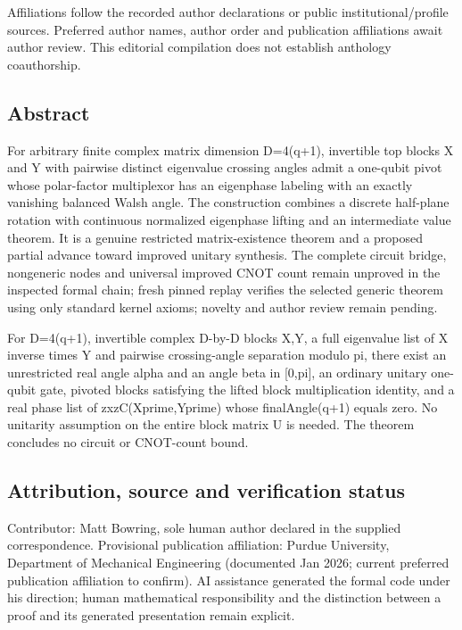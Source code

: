 \documentclass[11pt,a4paper]{article}
\begin{document}
{\small Affiliations follow the recorded author declarations or public institutional/profile sources. Preferred author names, author order and publication affiliations await author review. This editorial compilation does not establish anthology coauthorship.\par}

\subsection{Abstract}
For arbitrary finite complex matrix dimension D=4(q+1), invertible top blocks X and Y with pairwise distinct eigenvalue crossing angles admit a one-qubit pivot whose polar-factor multiplexor has an eigenphase labeling with an exactly vanishing balanced Walsh angle. The construction combines a discrete half-plane rotation with continuous normalized eigenphase lifting and an intermediate value theorem. It is a genuine restricted matrix-existence theorem and a proposed partial advance toward improved unitary synthesis. The complete circuit bridge, nongeneric nodes and universal improved CNOT count remain unproved in the inspected formal chain; fresh pinned replay verifies the selected generic theorem using only standard kernel axioms; novelty and author review remain pending.

For D=4(q+1), invertible complex D-by-D blocks X,Y, a full eigenvalue list of X inverse times Y and pairwise crossing-angle separation modulo pi, there exist an unrestricted real angle alpha and an angle beta in [0,pi], an ordinary unitary one-qubit gate, pivoted blocks satisfying the lifted block multiplication identity, and a real phase list of zxzC(Xprime,Yprime) whose finalAngle(q+1) equals zero. No unitarity assumption on the entire block matrix U is needed. The theorem concludes no circuit or CNOT-count bound.

\subsection{Attribution, source and verification status}
Contributor: Matt Bowring, sole human author declared in the supplied correspondence. Provisional publication affiliation: Purdue University, Department of Mechanical Engineering (documented Jan 2026; current preferred publication affiliation to confirm). AI assistance generated the formal code under his direction; human mathematical responsibility and the distinction between a proof and its generated presentation remain explicit.
\end{document}
